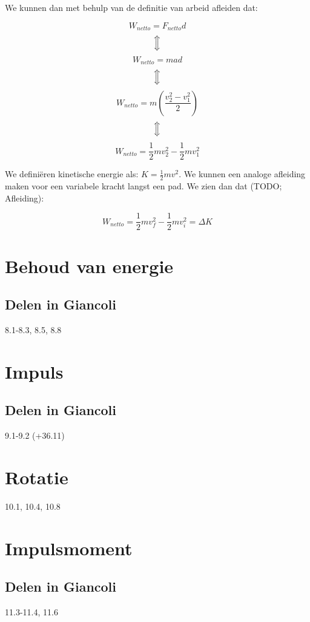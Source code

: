 \documentclass[12pt,a4paper]{article}
\newcommand{\Luda}{\Big\Updownarrow}
\begin{document}
    We kunnen dan met behulp van de definitie van arbeid afleiden dat:
    
    $$W_{netto} = F_{netto}d$$
    $$\Luda$$
    $$W_{netto} = mad$$
    $$\Luda$$
    $$W_{netto} = m\left( \frac{v_{2}^{2} - v_{1}^{2}}{2} \right)$$
    $$\Luda$$
    $$W_{netto} = \frac{1}{2} mv_{2}^{2} - \frac{1}{2} mv_{1}^{2} $$
    
    We definiëren kinetische energie als: $K = \frac{1}{2}mv^{2}$. We kunnen een analoge afleiding maken voor
    een variabele kracht langst een pad. We zien dan dat (TODO; Afleiding):
    
    $$W_{netto} = \frac{1}{2}mv_{f}^{2} - \frac{1}{2}mv_{i}^{2} = \Delta K$$
    
    \section{Behoud van energie}

    \subsection{Delen in Giancoli}
    8.1-8.3, 8.5, 8.8


    \section{Impuls}

    \subsection{Delen in Giancoli}
    9.1-9.2 (+36.11)


    \section{Rotatie}
    10.1, 10.4, 10.8


    \section{Impulsmoment}

    \subsection{Delen in Giancoli}
    11.3-11.4, 11.6
    
    
\end{document}
